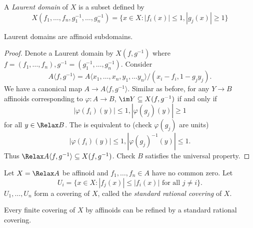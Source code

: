 \documentclass[a4paper]{article}
\let\Sp\Relax
\DeclareMathOperator{\Sp}{Sp} %
\begin{document}
\begin{definition}
  A \emph{Laurent domain} of \(X\) is a subset defined by
  \[
    X(f_1, \dots, f_n, g_1^{-1}, \dots, g_n^{-1}) = \{x \in X: |f_i(x)| \leq 1, |g_j(x)| \geq 1\}
  \]
\end{definition}

\begin{lemma}
  Laurent domains are affinoid subdomains.
\end{lemma}

\begin{proof}
  Denote a Laurent domain by \(X(f, g^{-1})\) where \(f = (f_1, \dots, f_n), g^{-1} = (g_1^{-1}, \dots, g_n^{-1})\). Consider
  \[
    A \langle f, g^{-1} \rangle = A \langle x_1, \dots, x_n, y_1, \dots y_n \rangle/(x_i - f_i, 1 - g_j y_j).
  \]
  We have a canonical map \(A \to A \langle f, g^{-1} \rangle\). Similar as before, for any \(Y \to B\) affinoids corresponding to \(\varphi: A \to B\), \(\im Y \subseteq X(f, g^{-1})\) if and only if
  \[
    |\varphi(f_i)(y)| \leq 1, |\varphi(g_j)(y)| \geq 1
  \]
  for all \(y \in \Sp B\). The is equivalent to (check \(\varphi(g_j)\) are units)
  \[
    |\varphi(f_i)(y)| \leq 1, |\varphi(g_j)^{-1}(y)| \leq 1.
  \]
  Thus \(\Sp A \langle f, g^{-1} \rangle \subseteq X(f, g^{-1})\). Check \(B\) satisfies the universal property.
\end{proof}

\begin{definition}
  Let \(X = \Sp A\) be affinoid and \(f_1, \dots, f_n \in A\) have no common zero. Let
  \[
    U_i = \{x \in X: |f_j(x)| \leq |f_i(x)| \text{ for all } j \ne i\}.
  \]
  \(U_1, \dots, U_n\) form a covering of \(X\), called the \emph{standard rational covering} of \(X\).
\end{definition}

\begin{lemma}
  Every finite covering of \(X\) by affinoids can be refined by a standard rational covering.
\end{lemma}
\end{document}
